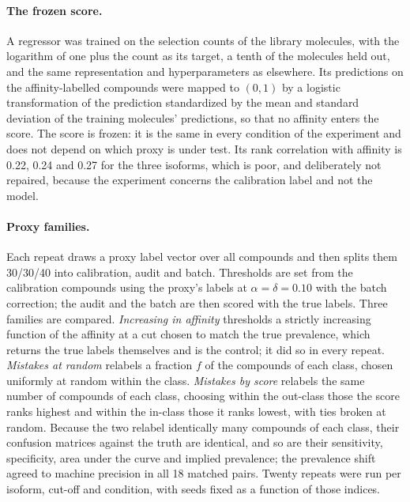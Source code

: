 \documentclass[10pt]{article}
\begin{document}
\paragraph{The frozen score.} A regressor was trained on the selection counts of the library molecules, with the logarithm of one plus the count as its target, a tenth of the molecules held out, and the same representation and hyperparameters as elsewhere. Its predictions on the affinity-labelled compounds were mapped to $(0,1)$ by a logistic transformation of the prediction standardized by the mean and standard deviation of the training molecules' predictions, so that no affinity enters the score. The score is frozen: it is the same in every condition of the experiment and does not depend on which proxy is under test. Its rank correlation with affinity is 0.22, 0.24 and 0.27 for the three isoforms, which is poor, and deliberately not repaired, because the experiment concerns the calibration label and not the model.

\paragraph{Proxy families.} Each repeat draws a proxy label vector over all compounds and then splits them 30/30/40 into calibration, audit and batch. Thresholds are set from the calibration compounds using the proxy's labels at $\alpha=\delta=0.10$ with the batch correction; the audit and the batch are then scored with the true labels. Three families are compared. \emph{Increasing in affinity} thresholds a strictly increasing function of the affinity at a cut chosen to match the true prevalence, which returns the true labels themselves and is the control; it did so in every repeat. \emph{Mistakes at random} relabels a fraction $f$ of the compounds of each class, chosen uniformly at random within the class. \emph{Mistakes by score} relabels the same number of compounds of each class, choosing within the out-class those the score ranks highest and within the in-class those it ranks lowest, with ties broken at random. Because the two relabel identically many compounds of each class, their confusion matrices against the truth are identical, and so are their sensitivity, specificity, area under the curve and implied prevalence; the prevalence shift agreed to machine precision in all 18 matched pairs. Twenty repeats were run per isoform, cut-off and condition, with seeds fixed as a function of those indices.
\end{document}
